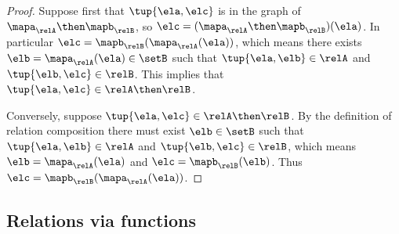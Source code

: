 \begin{proof}
    Suppose first that $\tup{\ela, \elc}$ is in the graph of $\mapa_\relA \then \mapb_\relB$, so $\elc = (\mapa_\relA \then \mapb_\relB)(\ela)$. In particular $\elc =  \mapb_\relB(\mapa_\relA(\ela))$, which means there exists $\elb = \mapa_\relA(\ela) \in \setB$ such that $\tup{\ela, \elb} \in \relA$ and $\tup{\elb, \elc} \in \relB$. This implies that $\tup{\ela, \elc} \in \relA \then \relB$.

   Conversely, suppose $\tup{\ela, \elc} \in \relA \then \relB$. By the definition of relation composition there must exist $\elb \in \setB$ such that $\tup{\ela, \elb} \in \relA$ and $\tup{\elb, \elc} \in \relB$, which means $\elb = \mapa_\relA(\ela)$ and $\elc = \mapb_\relB(\elb)$. Thus $\elc = \mapb_\relB(\mapa_\relA(\ela))$.

\end{proof}



\subsection{Relations via functions}

